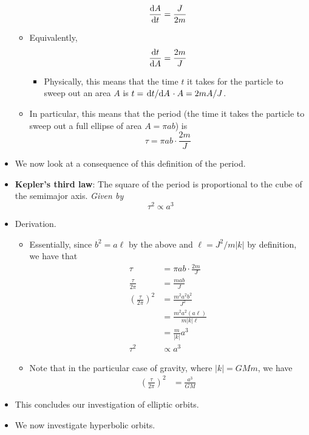 \documentclass[../notes.tex]{subfiles}
\begin{document}
\begin{itemize}
\begin{itemize}
\begin{equation*}
            \dv{A}{t} = \frac{J}{2m}
        \end{equation*}
        \item Equivalently,
        \begin{equation*}
            \dv{t}{A} = \frac{2m}{J}
        \end{equation*}
        \begin{itemize}
            \item Physically, this means that the time $t$ it takes for the particle to sweep out an area $A$ is $t=\dv*{t}{A}\cdot A=2mA/J$.
        \end{itemize}
        \item In particular, this means that the period (the time it takes the particle to sweep out a full ellipse of area $A=\pi ab$) is
        \begin{equation*}
            \tau = \pi ab\cdot\frac{2m}{J}
        \end{equation*}
    \end{itemize}
    \item We now look at a consequence of this definition of the period.
    \item \textbf{Kepler's third law}: The square of the period is proportional to the cube of the semimajor axis. \emph{Given by}
    \begin{equation*}
        \tau^2 \propto a^3
    \end{equation*}
    \item Derivation.
    \begin{itemize}
        \item Essentially, since $b^2=a\ell$ by the above and $\ell=J^2/m|k|$ by definition, we have that
        \begin{align*}
            \tau &= \pi ab\cdot\frac{2m}{J}\\
            \frac{\tau}{2\pi} &= \frac{mab}{J}\\
            \left( \frac{\tau}{2\pi} \right)^2 &= \frac{m^2a^2b^2}{J^2}\\
            &= \frac{m^2a^2(a\ell)}{m|k|\ell}\\
            &= \frac{m}{|k|}a^3\\
            \tau^2 &\propto a^3
        \end{align*}
        \item Note that in the particular case of gravity, where $|k|=GMm$, we have
        \begin{align*}
            \left( \frac{\tau}{2\pi} \right)^2 &= \frac{a^3}{GM}
        \end{align*}
    \end{itemize}
    \item This concludes our investigation of elliptic orbits.
    \item We now investigate hyperbolic orbits.
    \begin{figure}[h!]
        \centering
\end{figure}
\end{itemize}
\end{document}
